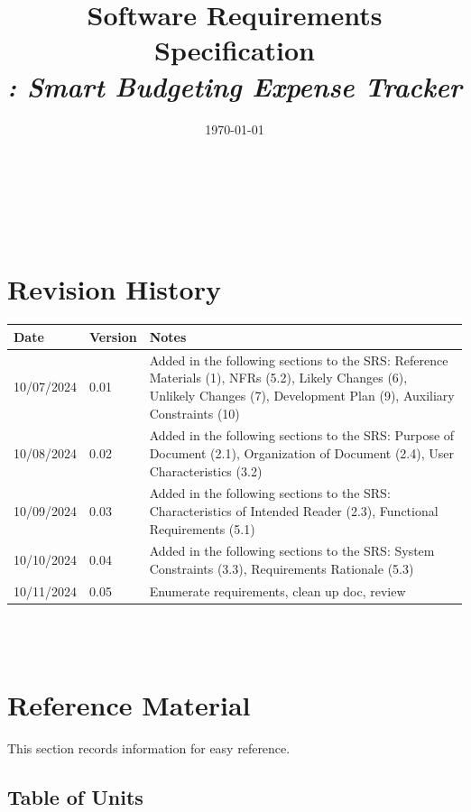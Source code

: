 \documentclass[12pt]{article}
\begin{document}
\title{Software Requirements Specification \\ \textit{\progname: Smart Budgeting Expense Tracker}} 
\author{\authname}
\date{\today}
	
\maketitle

~\newpage


\tableofcontents

~\newpage

\section*{Revision History}

\begin{tabularx}{\textwidth}{p{3cm}p{2cm}X}
\toprule {\bf Date} & {\bf Version} & {\bf Notes}\\
\midrule
10/07/2024 & 0.01 & Added in the following sections to the SRS: Reference Materials (1), NFRs (5.2), Likely Changes (6), Unlikely Changes (7), Development Plan (9), Auxiliary Constraints (10)\\
10/08/2024 & 0.02 & Added in the following sections to the SRS: Purpose of Document (2.1), Organization of Document (2.4), User Characteristics (3.2)\\
10/09/2024 & 0.03 & Added in the following sections to the SRS: Characteristics of Intended Reader (2.3), Functional Requirements (5.1)\\
10/10/2024 & 0.04 & Added in the following sections to the SRS: System Constraints (3.3), Requirements Rationale (5.3)\\
10/11/2024 & 0.05 & Enumerate requirements, clean up doc, review\\
\bottomrule 
\end{tabularx}

~\\


~\newpage

\section{Reference Material}

This section records information for easy reference.

\subsection{Table of Units}
\end{document}
